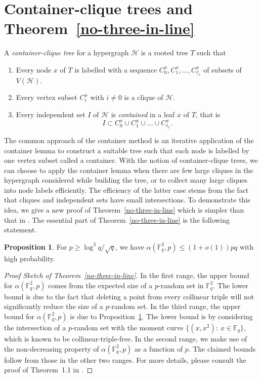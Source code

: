 \documentclass[11pt]{article}
\theoremstyle{definition}
\newtheorem{proposition}[theorem]{Proposition}
\begin{document}
\section{Container-clique trees and Theorem~\ref{no-three-in-line}}\label{sec:cctree}

A \textit{container-clique tree} for a hypergraph $\mathcal{H}$ is a rooted tree $T$ such that \begin{enumerate}
    \item Every node $x$ of $T$ is labelled with a sequence $C^x_0, C^x_1, \dots, C^x_{\ell_x}$ of subsets of $V(\mathcal{H})$.
    \item Every vertex subset $C^x_i$ with $i \neq 0$ is a clique of $\mathcal{H}$.
    \item Every independent set $I$ of $\mathcal{H}$ is \textit{contained} in a leaf $x$ of $T$, that is \begin{equation*}
        I \subset C^x_0 \cup C^x_1 \cup \dots \cup C^x_{\ell_x}.
    \end{equation*}
\end{enumerate}

The common approach of the container method is an iterative application of the container lemma to construct a suitable tree such that each node is labelled by one vertex subset called a container. With the notion of container-clique trees, we can choose to apply the container lemma when there are few large cliques in the hypergraph considered while building the tree, or to collect many large cliques into node labels efficiently. The efficiency of the latter case stems from the fact that cliques and independent sets have small intersections. To demonstrate this idea, we give a new proof of Theorem~\ref{no-three-in-line} which is simpler than that in \cite{chen2023random}. The essential part of Theorem~\ref{no-three-in-line} is the following statement. 
\begin{proposition}\label{no-three-in-line_key}
For $p \geq \log^3 q /\sqrt{q}$, we have $\alpha(\mathbb{F}^2_q,p) \leq (1+o(1))pq$ with high probability.
\end{proposition}
\begin{proof}[Proof Sketch of Theorem~\ref{no-three-in-line}]
    In the first range, the upper bound for $\alpha(\mathbb{F}^2_q,p)$ comes from the expected size of a $p$-random set in $\mathbb{F}_q^2$. The lower bound is due to the fact that deleting a point from every collinear triple will not significantly reduce the size of a $p$-random set. In the third range, the upper bound for $\alpha(\mathbb{F}^2_q,p)$ is due to Proposition~\ref{no-three-in-line_key}. The lower bound is by considering the intersection of a $p$-random set with the moment curve $\{(x,x^2):~ x\in \mathbb{F}_q\}$, which is known to be collinear-triple-free. In the second range, we make use of the non-decreasing property of $\alpha(\mathbb{F}^2_q,p)$ as a function of $p$. The claimed bounds follow from those in the other two ranges. For more details, please consult the proof of Theorem~1.1 in \cite{chen2023random}.
\end{proof}
\end{document}

